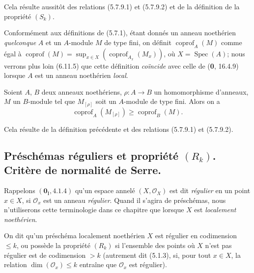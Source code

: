 
Cela résulte aussitôt des relations (5.7.9.1) et (5.7.9.2) et de la
définition de la propriété $(S_k)$.

\begin{env}[5.7.12]
\label{IV.2.s5.7.12-fr}
Conformément aux définitions de (5.7.1), étant donnés un anneau noethérien
\emph{quelconque} $A$ et un $A$-module $M$ de type fini, on définit
$\operatorname{coprof}_A(M)$ comme égal à
$\operatorname{coprof}(M)=\sup_{x\in X}
(\operatorname{coprof}_{A_x}(M_x))$, où $X=\operatorname{Spec}(A)$;
nous verrons plus loin (6.11.5) que cette définition \emph{coïncide} avec celle de
(\textbf{0}, 16.4.9) lorsque $A$ est un anneau noethérien \emph{local}.
\end{env}

\begin{corollary}[5.7.13]
\label{IV.2.s5.7.13-fr}
Soient $A$, $B$ deux anneaux noethériens, $\rho:A\to B$ un homomorphisme
d'anneaux, $M$ un $B$-module tel que $M_{[\rho]}$ soit un $A$-module de type
fini. Alors on a
\begin{equation}
\operatorname{coprof}_A(M_{[\rho]})\geq\operatorname{coprof}_B(M).
\tag{5.7.13.1}\label{IV.2.s5.7.13.1-fr}
\end{equation}
\end{corollary}

Cela résulte de la définition précédente et des relations (5.7.9.1) et
(5.7.9.2).

\subsection{\texorpdfstring{Préschémas réguliers et propriété $(R_k)$. Critère de normalité de Serre.}{Préschémas réguliers et propriété (R\string_k). Critère de normalité de Serre}}

\begin{env}[5.8.1]
\label{IV.2.s5.8.1-fr}
Rappelons $(\mathbf{0}_{\mathrm I},4.1.4)$ qu'un espace annelé
$(X,\mathcal O_X)$ est dit \emph{régulier} en un point $x\in X$, si
$\mathcal O_x$ est un anneau \emph{régulier}. Quand il s'agira de préschémas, nous
n'utiliserons cette terminologie dans ce chapitre que lorsque $X$ est
\emph{localement noethérien}.
\end{env}

\begin{definition}[5.8.2]
\label{IV.2.s5.8.2-fr}
On dit qu'un préschéma localement noethérien $X$ est \textup{régulier en codimension
$\leq k$}, ou \textup{possède la propriété $(R_k)$} si l'ensemble des points où $X$
n'est pas régulier est de codimension $>k$ \textup{(autrement dit (5.1.3),} si, pour
tout $x\in X$, la relation $\dim(\mathcal O_x)\leq k$ entraîne que
$\mathcal O_x$ est régulier).
\end{definition}

